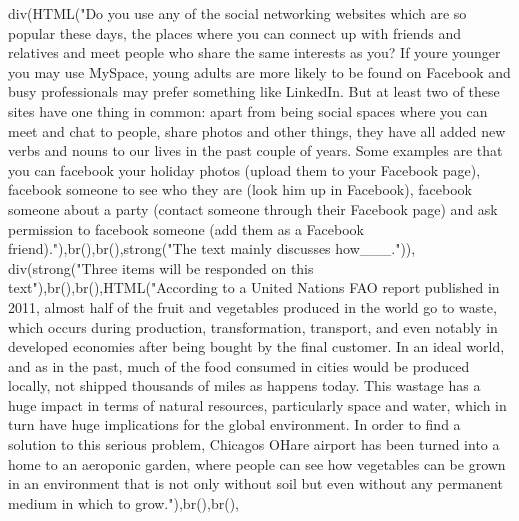 \documentclass[
]{article}
\newenvironment{Shaded}{\begin{snugshade}}{\end{snugshade}}
\newcommand{\FunctionTok}[1]{\textcolor[rgb]{0.00,0.00,0.00}{#1}}
\newcommand{\NormalTok}[1]{#1}
\newcommand{\StringTok}[1]{\textcolor[rgb]{0.31,0.60,0.02}{#1}}
\begin{document}
\begin{Shaded}
\begin{Highlighting}[]
           \FunctionTok{div}\NormalTok{(}\FunctionTok{HTML}\NormalTok{(}\StringTok{"Do you use any of the social networking websites which are so popular these days, the places where you can connect up with friends and relatives and meet people who share the same interests as you? If youre younger you may use MySpace, young adults are more likely to be found on Facebook and busy professionals may prefer something like LinkedIn. But at least two of these sites have one thing in common: apart from being social spaces where you can meet and chat to people, share photos and other things, they have all added new verbs and nouns to our lives in the past couple of years. Some examples are that you can facebook your holiday photos (upload them to your Facebook page), facebook someone to see who they are (look him up in Facebook), facebook someone about a party (contact someone through their Facebook page) and ask permission to facebook someone (add them as a Facebook friend)."}\NormalTok{),}\FunctionTok{br}\NormalTok{(),}\FunctionTok{br}\NormalTok{(),}\FunctionTok{strong}\NormalTok{(}\StringTok{"The text mainly discusses how\_\_\_."}\NormalTok{)),}
           \FunctionTok{div}\NormalTok{(}\FunctionTok{strong}\NormalTok{(}\StringTok{"Three items will be responded on this text"}\NormalTok{),}\FunctionTok{br}\NormalTok{(),}\FunctionTok{br}\NormalTok{(),}\FunctionTok{HTML}\NormalTok{(}\StringTok{"According to a United Nations FAO report published in 2011, almost half of the fruit and vegetables produced in the world go to waste, which occurs during production, transformation, transport, and even  notably in developed economies  after being bought by the final customer. In an ideal world, and as in the past, much of the food consumed in cities would be produced locally, not shipped thousands of miles as happens today. This wastage has a huge impact in terms of natural resources, particularly space and water, which in turn have huge implications for the global environment. In order to find a solution to this serious problem, Chicago\textquotesingle{}s O\textquotesingle{}Hare airport has been turned into a home to an aeroponic garden, where people can see how vegetables can be grown in an environment that is not only without soil but even without any permanent medium in which to grow."}\NormalTok{),}\FunctionTok{br}\NormalTok{(),}\FunctionTok{br}\NormalTok{(), }

\end{Highlighting}
\end{Shaded}
\end{document}
